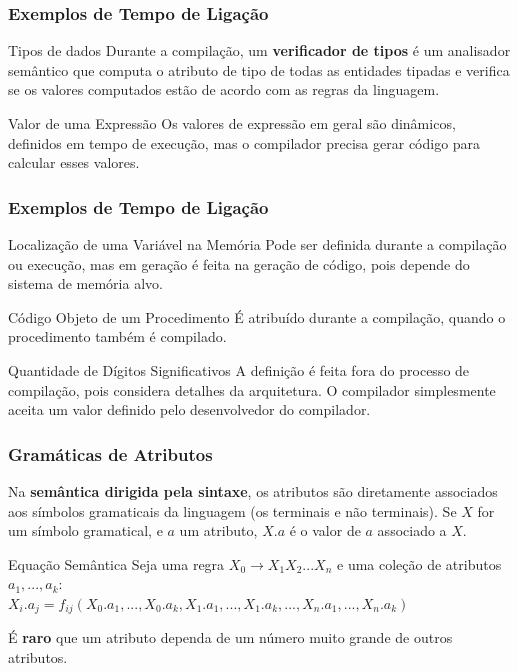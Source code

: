 \documentclass[table]{beamer}
\begin{document}
\begin{frame}
   \frametitle{Exemplos de Tempo de Ligação}
   \begin{block}{Tipos de dados}
   Durante a compilação, um \textbf{verificador de tipos} é um analisador semântico que computa o atributo de tipo de todas as entidades tipadas e verifica se os valores computados estão de acordo com as regras da linguagem.
   \end{block}
   \begin{block}{Valor de uma Expressão}
   Os valores de expressão em geral são dinâmicos, definidos em tempo de execução, mas o compilador precisa gerar código para calcular esses valores.
   \end{block}
\end{frame}

\begin{frame}
   \frametitle{Exemplos de Tempo de Ligação}
   \begin{block}{Localização de uma Variável na Memória}
   Pode ser definida durante a compilação ou execução, mas em geração é feita na geração de código, pois depende do sistema de memória alvo. 
   \end{block}
   \begin{block}{Código Objeto de um Procedimento}
   É atribuído durante a compilação, quando o procedimento também é compilado.
   \end{block}
   \begin{block}{Quantidade de Dígitos Significativos}
   A definição é feita fora do processo de compilação, pois considera detalhes da arquitetura. O compilador simplesmente aceita um valor definido pelo desenvolvedor do compilador.
   \end{block}
\end{frame}

\begin{frame}
   \frametitle{Gramáticas de Atributos}
   Na \textbf{semântica dirigida pela sintaxe}, os atributos são diretamente associados aos símbolos gramaticais da linguagem (os terminais e não terminais). Se $X$ for um símbolo gramatical, e $a$ um atributo, $X.a$ é o valor de $a$ associado a $X$. 
   \begin{block}{Equação Semântica}
   Seja uma regra $X_{0}\to X_{1}X_{2}...X_{n}$ e uma coleção de atributos $a_{1},...,a_{k}$: \\
   $X_{i}.a_{j}=f_{ij}(X_{0}.a_{1},...,X_{0}.a_{k},X_{1}.a_{1},...,X_{1}.a_{k},...,X_{n}.a_{1},...,X_{n}.a_{k})$
   \end{block}
   É \textbf{raro} que um atributo dependa de um número muito grande de outros atributos.
\end{frame}
\end{document}
